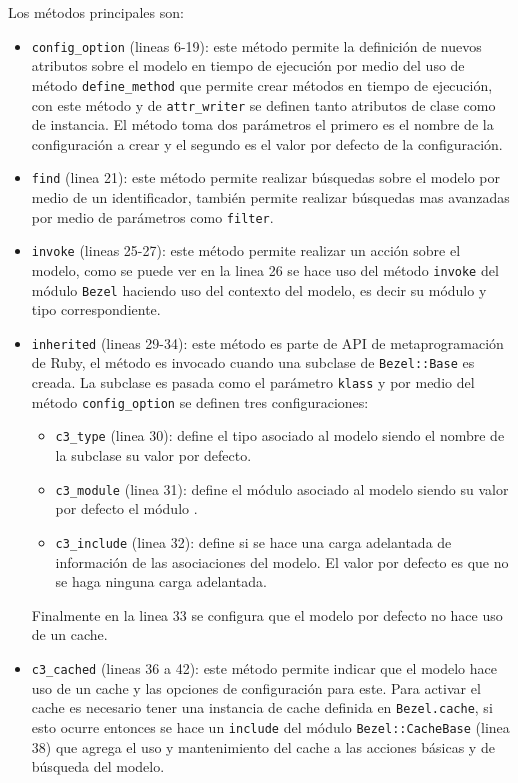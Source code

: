 Los métodos principales son:
\begin{itemize}
\item \texttt{config\_option} (lineas 6-19): este método permite la definición
  de nuevos atributos sobre el modelo en tiempo de ejecución por medio del uso
  de método \texttt{define\_method} que permite crear métodos en tiempo
  de ejecución, con este método y de \texttt{attr\_writer} se definen tanto
  atributos de clase como de instancia. El método toma dos parámetros
  el primero es el nombre de la configuración a crear y el segundo
  es el valor por defecto de la configuración.
\item \texttt{find} (linea 21): este método permite realizar búsquedas sobre
  el modelo por medio de un identificador, también permite realizar búsquedas
  mas avanzadas por medio de parámetros como \texttt{filter}.
\item \texttt{invoke} (lineas 25-27): este método permite realizar
  un acción sobre el modelo, como se puede ver en la linea 26 se hace uso del
  método \texttt{invoke} del módulo \texttt{Bezel} haciendo
  uso del contexto del modelo, es decir su módulo y tipo correspondiente.
\item \texttt{inherited} (lineas 29-34): este método es parte de API de
  metaprogramación de Ruby, el método es invocado cuando una subclase de
  \texttt{Bezel::Base} es creada. La subclase es pasada como el parámetro
  \texttt{klass} y por medio del método \texttt{config\_option} se definen
  tres configuraciones:
  \begin{itemize}
  \item \texttt{c3\_type} (linea 30): define el tipo asociado al modelo
    siendo el nombre de la subclase su valor por defecto.
  \item \texttt{c3\_module} (linea 31): define el módulo asociado al modelo
    siendo su valor por defecto el módulo .
  \item \texttt{c3\_include} (linea 32): define si se hace una carga adelantada
    de información de las asociaciones del modelo. El valor por defecto es que
    no se haga ninguna carga adelantada.
  \end{itemize}
  Finalmente en la linea 33 se configura que el modelo por defecto no hace uso
  de un cache.
\item \texttt{c3\_cached} (lineas 36 a 42): este método permite indicar
  que el modelo hace uso de un cache y las opciones de configuración para este.
  Para activar el cache es necesario tener una instancia de cache definida en
  \texttt{Bezel.cache}, si esto ocurre entonces se hace un \texttt{include}
  del módulo \texttt{Bezel::CacheBase} (linea 38) que agrega el uso y
  mantenimiento del cache a las acciones básicas y de búsqueda del modelo.
\end{itemize}

